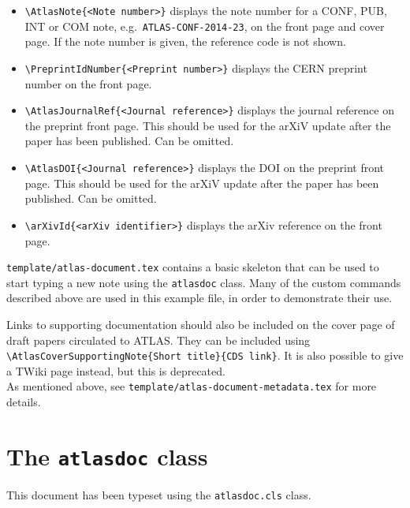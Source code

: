 \documentclass[atlasstyle,UKenglish]{latex/atlasdoc}
\begin{document}
\begin{itemize}
  \item {\verb|\AtlasNote{<Note number>}|} displays the note number
    for a CONF, PUB, INT or COM note, e.g.\ \texttt{ATLAS-CONF-2014-23},
    on the front page and cover page.
    If the note number is given, the reference code is not shown.

  \item {\verb|\PreprintIdNumber{<Preprint number>}|} displays the CERN
    preprint number on the front page.

  \item {\verb|\AtlasJournalRef{<Journal reference>}|} displays the journal reference
    on the preprint front page.
    This should be used for the arXiV update after the paper has been published.
    Can be omitted.

  \item {\verb|\AtlasDOI{<Journal reference>}|} displays the DOI
    on the preprint front page.
    This should be used for the arXiV update after the paper has been published.
    Can be omitted.

  \item {\verb|\arXivId{<arXiv identifier>}|} displays the arXiv reference
    on the front page.

\end{itemize}
%
\texttt{template/atlas-document.tex} contains a basic skeleton that can be
used to start typing a new note using the \texttt{atlasdoc} class. Many of
the custom commands described above are used in this example file, in
order to demonstrate their use.

Links to supporting documentation should also be included on the cover page of draft papers circulated to ATLAS.
They can be included using
\verb|\AtlasCoverSupportingNote{Short title}{CDS link}|.
It is also possible to give a TWiki page instead, but this is deprecated.\\
As mentioned above, see \texttt{template/atlas-document-metadata.tex} for more details.

\section{The \texttt{atlasdoc} class}
\label{app:atlasdoc}

This document has been typeset using the \texttt{atlasdoc.cls} class.
\end{document}
